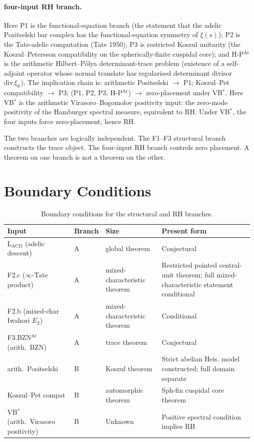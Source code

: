 \paragraph{four-input RH branch.}
Here P1 is the functional-equation branch (the statement that the
adelic Pozitsel\textquotesingle ski bar complex has the
functional-equation symmetry of \(\xi(s)\)); P2 is the
Tate-adelic computation (Tate 1950);
P3 is restricted Koszul unitarity (the Koszul--Petersson compatibility
on the spherically-finite cuspidal core); and H-P\(^{\mathrm{Ar}}\)
is the arithmetic Hilbert--P\'olya determinant-trace problem
(existence of a self-adjoint operator whose normal translate has
regularised determinant divisor \(\mathrm{div}\,\xi_{\mathbb R}\)).
The implication chain is: arithmetic Positselski
\(\to\) P1; Koszul--Pet compatibility \(\to\) P3; (P1, P2, P3,
H-P\(^{\mathrm{Ar}}\)) \(\to\) zero-placement under VB\(^{*}\). Here
VB\(^{*}\) is the arithmetic Virasoro--Bogomolov positivity input:
the zero-mode positivity of the Hamburger spectral measure,
equivalent to RH. Under VB\(^{*}\), the four inputs force
zero-placement, hence RH.

The two branches are logically independent.  The F1--F3 structural
branch constructs the trace object.  The four-input RH branch controls
zero placement.  A theorem on one branch is not a theorem on the other.

\section{Boundary Conditions}
\label{v4-arith:app:C:residual-list}

\begin{table}[h]
\centering
\small
\begin{tabular}{l|l|l|l}
Input & Branch & Size & Present form \\
\hline
\(\mathrm{L}_{\mathrm{ACD}}\) (adelic descent) & A & global theorem & Conjectural \\
F2.c (\(\infty\)-Tate product) & A & mixed-characteristic theorem & Restricted pointed central-unit theorem; full mixed-characteristic statement conditional \\
F2.b (mixed-char Iwahori \(E_{2}\)) & A & mixed-characteristic theorem & Conditional \\
F3.BZN\(^{\mathrm{Ar}}\) (arith.~BZN) & A & trace theorem & Conjectural \\
arith.~Positselski & B & Koszul theorem & Strict abelian Heis. model constructed; full domain separate \\
Koszul--Pet compat & B & automorphic theorem & Sph-fin cuspidal core theorem \\
VB\(^{*}\) (arith.~Virasoro positivity) & B & Unknown & Positive spectral condition implies RH \\
\end{tabular}
\caption{Boundary conditions for the structural and RH branches.}
\label{v4-arith:app:C:residual-table}
\end{table}

